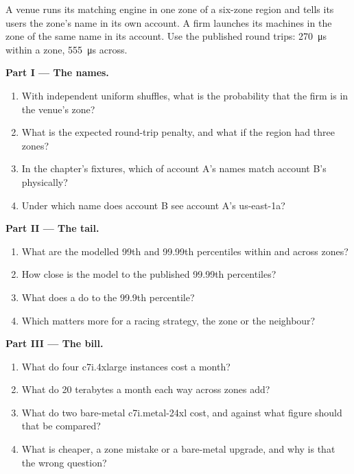 \begin{problem}\label{pb:nw:trading-in-a-public-cloud:1}
A venue runs its matching engine in one zone of a six-zone region and tells its users the zone's name in its own account. A firm launches its machines
in the zone of the same name in its account. Use the published round trips: \qty{270}{\micro\second} within a zone, \qty{555}{\micro\second} across.

\medskip\noindent\textbf{Part I --- The names.}
\begin{enumerate}
\item With independent uniform shuffles, what is the probability that the firm is in the venue's zone?
\item What is the expected round-trip penalty, and what if the region had three zones?
\item In the chapter's fixtures, which of account A's names match account B's physically?
\item Under which name does account B see account A's us-east-1a?
\end{enumerate}

\medskip\noindent\textbf{Part II --- The tail.}
\begin{enumerate}[resume]
\item What are the modelled 99th and 99.99th percentiles within and across zones?
\item How close is the model to the published 99.99th percentiles?
\item What does a  do to the 99.9th percentile?
\item Which matters more for a racing strategy, the zone or the neighbour?
\end{enumerate}

\medskip\noindent\textbf{Part III --- The bill.}
\begin{enumerate}[resume]
\item What do four c7i.4xlarge instances cost a month?
\item What do 20 terabytes a month each way across zones add?
\item What do two bare-metal c7i.metal-24xl cost, and against what  figure should that be compared?
\item What is cheaper, a zone mistake or a bare-metal upgrade, and why is that the wrong question?
\end{enumerate}


\end{problem}
